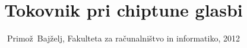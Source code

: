 \documentclass[journal]{IEEEtran}
\begin{document}
%
\title{Tokovnik pri chiptune glasbi}
%
%
%

\author{Primož~Bajželj, Fakulteta za računalništvo in informatiko, 2012 %
}

% 
%



% 
\end{document}
